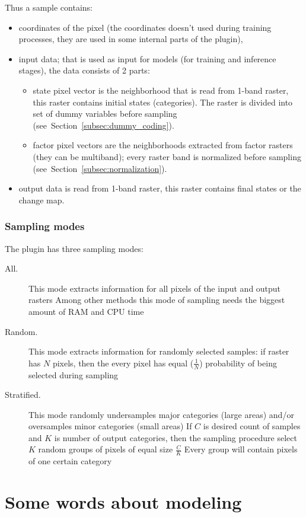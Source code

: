 \documentclass{report}
\begin{document}
Thus a sample contains:
\begin{itemize}
    \item coordinates of the pixel (the coordinates doesn't used during training processes, they are used in some internal parts of the plugin),
    \item input data; that is used as input for models (for training and inference stages), the data consists of 2 parts:
      \begin{itemize}
      \item state pixel vector is the neighborhood that is read from 1-band raster, this raster contains initial states (categories). The raster is divided into set of dummy variables before sampling (see~Section~\ref{subsec:dummy_coding}).
        \item factor pixel vectors are the neighborhoods extracted from factor rasters (they can be multiband); every raster band is normalized before sampling (see~Section~\ref{subsec:normalization}).
      \end{itemize}
    \item output data is read from 1-band raster, this raster contains final states or the change map.
\end{itemize}

\subsubsection{Sampling modes}\label{subsec:sampling_modes}
The plugin has three sampling modes:
\begin{description}
    \item[All.] This mode extracts information for all pixels of the input and output rasters Among other methods this mode of sampling needs the biggest amount of RAM and CPU time
    \item[Random.] This mode extracts information for randomly selected samples: if raster has $N$ pixels, then the every pixel has equal ($\frac1N$) probability of being selected during sampling
    \item[Stratified.] This mode randomly undersamples major categories (large areas) and/or oversamples minor categories (small areas) If $C$ is desired count of samples and $K$ is number of output categories, then the sampling procedure select $K$ random groups of pixels of equal size $\frac{C}{K}$ Every group will contain pixels of one certain category
\end{description}

\section{Some words about modeling}\label{sec:modeling}
\end{document}
